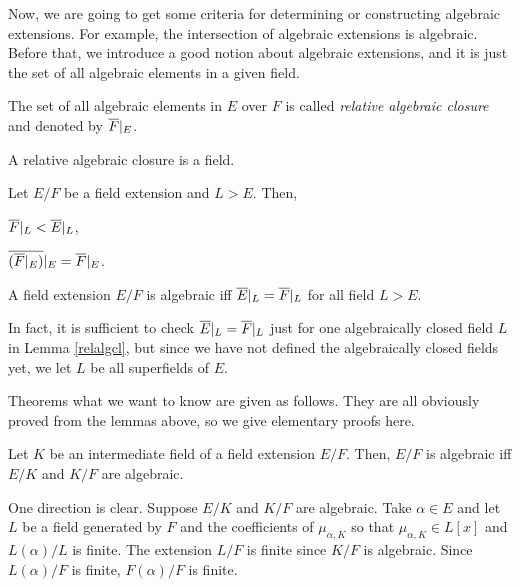 \documentclass{../exp}
\begin{document}
Now, we are going to get some criteria for determining or constructing algebraic extensions.
For example, the intersection of algebraic extensions is algebraic.
Before that, we introduce a good notion about algebraic extensions, and it is just the set of all algebraic elements in a given field.

\begin{defn}
The set of all algebraic elements in $E$ over $F$ is called \emph{relative algebraic closure} and denoted by $\overline F|_E$.
\end{defn}
\begin{prop}
A relative algebraic closure is a field.
\end{prop}
\begin{pf}
\end{pf}
\begin{lem}
Let $E/F$ be a field extension and $L>E$.
Then,
\begin{cond}
\item $\overline F|_L<\overline E|_L$,
\item $\overline{(\overline F|_E)}|_E=\overline F|_E$.
\end{cond}
\begin{pf}
\end{pf}
\end{lem}
\begin{lem}\label{relalgcl}
A field extension $E/F$ is algebraic iff $\overline E|_L=\overline F|_L$ for all field $L>E$.
\end{lem}
\begin{pf}
\end{pf}
\begin{rmk}
In fact, it is sufficient to check $\overline E|_L=\overline F|_L$ just for one algebraically closed field $L$ in Lemma \ref{relalgcl}, but since we have not defined the algebraically closed fields yet, we let $L$ be all superfields of $E$.
\end{rmk}

Theorems what we want to know are given as follows.
They are all obviously proved from the lemmas above, so we give elementary proofs here.

\begin{thm}
Let $K$ be an intermediate field of a field extension $E/F$.
Then, $E/F$ is algebraic iff $E/K$ and $K/F$ are algebraic.
\end{thm}
\begin{pf}
One direction is clear.
Suppose $E/K$ and $K/F$ are algebraic.
Take $\alpha\in E$ and let $L$ be a field generated by $F$ and the coefficients of $\mu_{\alpha,K}$ so that $\mu_{\alpha,K}\in L[x]$ and $L(\alpha)/L$ is finite.
The extension $L/F$ is finite since $K/F$ is algebraic.
Since $L(\alpha)/F$ is finite, $F(\alpha)/F$ is finite.
\end{pf}
\end{document}
